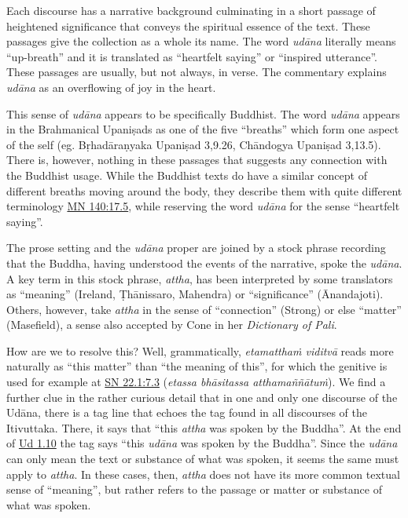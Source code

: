 \documentclass[12pt,openany]{book}%
\begin{document}
Each discourse has a narrative background culminating in a short passage of heightened significance that conveys the spiritual essence of the text. These passages give the collection as a whole its name. The word \textit{\textsanskrit{udāna}} literally means “up-breath” and it is translated as “heartfelt saying” or “inspired utterance”. These passages are usually, but not always, in verse. The commentary explains \textit{\textsanskrit{udāna}} as an overflowing of joy in the heart.

This sense of \textit{\textsanskrit{udāna}} appears to be specifically Buddhist. The word \textit{\textsanskrit{udāna}} appears in the Brahmanical \textsanskrit{Upaniṣads} as one of the five “breaths” which form one aspect of the self (eg. \textsanskrit{Bṛhadāraṇyaka} \textsanskrit{Upaniṣad} 3,9.26, \textsanskrit{Chāndogya} \textsanskrit{Upaniṣad} 3,13.5). There is, however, nothing in these passages that suggests any connection with the Buddhist usage. While the Buddhist texts do have a similar concept of different breaths moving around the body, they describe them with quite different terminology \href{https://suttacentral.net/mn140/en/sujato\#17.5}{MN 140:17.5}, while reserving the word \textit{\textsanskrit{udāna}} for the sense “heartfelt saying”.

The prose setting and the \textit{\textsanskrit{udāna}} proper are joined by a stock phrase recording that the Buddha, having understood the events of the narrative, spoke the \textit{\textsanskrit{udāna}}. A key term in this stock phrase, \textit{attha}, has been interpreted by some translators as “meaning” (Ireland, \textsanskrit{Ṭhānissaro}, Mahendra) or “significance” (Ānandajoti). Others, however, take \textit{attha} in the sense of “connection” (Strong) or else “matter” (Masefield), a sense also accepted by Cone in her \textit{Dictionary of Pali}. 

How are we to resolve this? Well, grammatically, \textit{\textsanskrit{etamatthaṁ} \textsanskrit{viditvā}} reads more naturally as “this matter” than “the meaning of this”, for which the genitive is used for example at \href{https://suttacentral.net/sn22.1/en/sujato\#7.3}{SN 22.1:7.3} (\textit{etassa \textsanskrit{bhāsitassa} \textsanskrit{atthamaññātuṁ}}). We find a further clue in the rather curious detail that in one and only one discourse of the \textsanskrit{Udāna}, there is a tag line that echoes the tag found in all discourses of the Itivuttaka. There, it says that “this \textit{attha} was spoken by the Buddha”. At the end of \href{https://suttacentral.net/ud1.10/en/sujato}{Ud 1.10}  the tag says “this \textit{\textsanskrit{udāna}} was spoken by the Buddha”. Since the \textit{\textsanskrit{udāna}} can only mean the text or substance of what was spoken, it seems the same must apply to \textit{attha}. In these cases, then, \textit{attha} does not have its more common textual sense of “meaning”, but rather refers to the passage or matter or substance of what was spoken.
\end{document}
